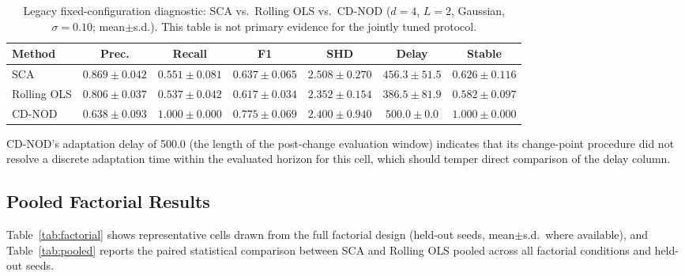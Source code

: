 \documentclass{ieeeaccess}
\begin{document}
\begin{table}[!t]
\caption{Legacy fixed-configuration diagnostic: SCA vs.\ Rolling OLS vs.\ CD-NOD ($d=4$, $L=2$, Gaussian, $\sigma=0.10$; mean$\pm$s.d.). This table is not primary evidence for the jointly tuned protocol.}
\label{tab:canonical}
\centering
\small
\setlength{\tabcolsep}{6pt}
\begin{tabular}{lcccccc}
\toprule
\textbf{Method} & \textbf{Prec.} & \textbf{Recall} & \textbf{F1} & \textbf{SHD} & \textbf{Delay} & \textbf{Stable}\\
\midrule
SCA         & $0.869\pm0.042$ & $0.551\pm0.081$ & $0.637\pm0.065$ & $2.508\pm0.270$ & $456.3\pm51.5$ & $0.626\pm0.116$\\
Rolling OLS & $0.806\pm0.037$ & $0.537\pm0.042$ & $0.617\pm0.034$ & $2.352\pm0.154$ & $386.5\pm81.9$ & $0.582\pm0.097$\\
CD-NOD      & $0.638\pm0.093$ & $1.000\pm0.000$ & $0.775\pm0.069$ & $2.400\pm0.940$ & $500.0\pm0.0$  & $1.000\pm0.000$\\
\bottomrule
\end{tabular}
\end{table}

CD-NOD's adaptation delay of 500.0 (the length of the post-change evaluation window) indicates that its change-point procedure did not resolve a discrete adaptation time within the evaluated horizon for this cell, which should temper direct comparison of the delay column.

\subsection{Pooled Factorial Results}
\label{res:pooled}
Table~\ref{tab:factorial} shows representative cells drawn from the full factorial design (held-out seeds, mean$\pm$s.d.\ where available), and Table~\ref{tab:pooled} reports the paired statistical comparison between SCA and Rolling OLS pooled across all factorial conditions and held-out seeds.
\end{document}
